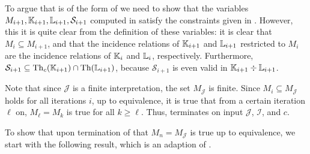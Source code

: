 To argue that  is of the form of
 we need to show that the
variables $M_{i+1}, {\mathbb{K}}_{i+1}, {\mathbb{L}}_{i+1}, \mathcal{S}_{i+1}$ computed in
 satisfy the constraints given in
.  However, this it is quite
clear from the definition of these variables: it is clear that $M_{i} \subseteq M_{i+1}$,
and that the incidence relations of ${\mathbb{K}}_{i+1}$ and ${\mathbb{L}}_{i+1}$ restricted to
$M_{i}$ are the incidence relations of ${\mathbb{K}}_{i}$ and ${\mathbb{L}}_{i}$, respectively.
Furthermore, $\mathcal{S}_{i+1} \subseteq \operatorname{Th}_{c}({\mathbb{K}}_{i+1}) \cap \operatorname{Th}({\mathbb{L}}_{i+1})$,
because $\mathcal{S}_{i+1}$ is even valid in ${\mathbb{K}}_{i+1} \div {\ensuremath{\mathbb{L}}}_{i+1}$.

Note that since $\mathcal{J}$ is a finite interpretation, the set $M_{\mathcal{J}}$ is
finite.  Since $M_{i} \subseteq M_{\mathcal{J}}$ holds for all iterations $i$, up to
equivalence, it is true that from a certain iteration $\ell$ on, $M_{\ell} = M_{k}$ is
true for all $k \geq \ell$.  Thus, 
terminates on input $\mathcal{J}$, $\mathcal{I}$, and $c$.

To show that upon termination of  that
$M_{n} = M_{\mathcal{J}}$ is true up to equivalence, we start with the following result,
which is an adaption of \cite[Lemma~6.7]{Diss-Felix}.

